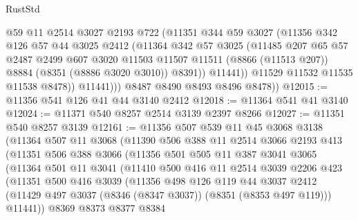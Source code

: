 \begin{lexlean}{RustStd}
\begin{coremodule}
{\begin{coremodule}
{{{{{{{{{{{{{{{{{{{{{{{{{{{{{{{{{{{{{{{{{{{{{{{{{{                  @59
                  @11
                  @2514
                  @3027
                  @2193
                  @722
                  (@11351
                    @344
                    @59
                    @3027
                    (@11356
                      @342
                      @126
                      @57
                      @44
                      @3025
                      @2412
                      (@11364
                        @342
                        @57
                        @3025
                        (@11485
                          @207
                          @65
                          @57
                          @2487
                          @2499
                          @607
                          @3020
                          @11503
                          @11507
                          @11511
                          (@8866 (@11513 @207))
                          @8884
                          (@8351 (@8886 @3020 @3010))
                          @8391))
                      @11441))
                  @11529
                  @11532
                  @11535
                  @11538
                  @8478))
              @11441)))
        @8487
        @8490
        @8493
        @8496
        @8478))
@12015 := @11356 @541 @126 @41 @44 @3140 @2412
@12018 := @11364 @541 @41 @3140
@12024 := @11371 @540 @8257 @2514 @3139 @2397 @8266
@12027 := @11351 @540 @8257 @3139
@12161 := @11356
    @507
    @539
    @11
    @45
    @3068
    @3138
    (@11364
      @507
      @11
      @3068
      (@11390
        @506
        @388
        @11
        @2514
        @3066
        @2193
        @413
        (@11351
          @506
          @388
          @3066
          (@11356
            @501
            @505
            @11
            @387
            @3041
            @3065
            (@11364
              @501
              @11
              @3041
              (@11410
                @500
                @416
                @11
                @2514
                @3039
                @2206
                @423
                (@11351
                  @500
                  @416
                  @3039
                  (@11356
                    @498
                    @126
                    @119
                    @44
                    @3037
                    @2412
                    (@11429 @497 @3037 (@8346 (@8347 @3037)) (@8351 (@8353 @497 @119)))
                    @11441))
                @8369
                @8373
                @8377
                @8384
}}}}}}}}}}}}}}}}}}}}}}}}}}}}}}}}}}}}}}}}}}}}}}}}}}
\end{coremodule}}
\end{coremodule}
\end{lexlean}
